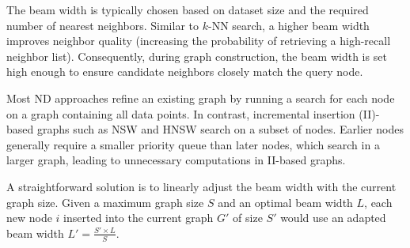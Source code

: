 The beam width is typically chosen based on dataset size and the required number of nearest neighbors. Similar to \( k \)-NN search, a higher beam width improves neighbor quality (increasing the probability of retrieving a high-recall neighbor list). Consequently, during graph construction, the beam width is set high enough to ensure candidate neighbors closely match the query node. 

Most ND approaches refine an existing graph by running a search for each node on a graph containing all data points. In contrast, incremental insertion (II)-based graphs such as NSW and HNSW search on a subset of nodes. Earlier nodes generally require a smaller priority queue than later nodes, which search in a larger graph, leading to unnecessary computations in II-based graphs.

A straightforward solution is to linearly adjust the beam width with the current graph size. Given a maximum graph size \( S \) and an optimal beam width \( L \), each new node \( i \) inserted into the current graph \( G' \) of size \( S' \) would use an adapted beam width \( L' = \frac{S' \times L}{S} \).
